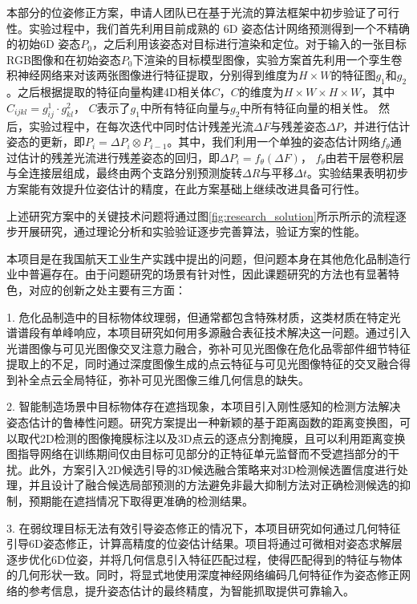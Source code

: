 \documentclass[12pt]{article}
\begin{document}
本部分的位姿修正方案，申请人团队已在基于光流的算法框架中初步验证了可行性。实验过程中，我们首先利用目前成熟的 6D 姿态估计网络预测得到一个不精确的初始6D 姿态$P_0$，之后利用该姿态对目标进行渲染和定位。对于输入的一张目标RGB图像和在初始姿态$P_0$下渲染的目标模型图像，实验方案首先利用一个孪生卷积神经网络来对该两张图像进行特征提取，分别得到维度为$H\times W$的特征图$g_1$和$g_2$。之后根据提取的特征向量构建4D相关体$C$，$C$的维度为$H\times W \times H \times W$，其中    $C_{ijkl} = g^1_{ij} \cdot g^2_{kl}$，
$C$表示了$g_1$中所有特征向量与$g_2$中所有特征向量的相关性。
然后，实验过程中，在每次迭代中同时估计残差光流$\Delta F$与残差姿态$\Delta P$，并进行估计姿态的更新，即$P_i = \Delta P_i \otimes P_{i-1}$。其中，我们利用一个单独的姿态估计网络$f_{\theta}$通过估计的残差光流进行残差姿态的回归，即$\Delta P_i = f_{\theta}(\Delta F)$，
$f_\theta$由若干层卷积层与全连接层组成，最终由两个支路分别预测旋转$\Delta R$与平移$\Delta t$。实验结果表明初步方案能有效提升位姿估计的精度，在此方案基础上继续改进具备可行性。

上述研究方案中的关键技术问题将通过图\ref{fig:research_solution}所示所示的流程逐步开展研究，通过理论分析和实验验证逐步完善算法，验证方案的性能。



本项目是在我国航天工业生产实践中提出的问题，但问题本身在其他危化品制造行业中普遍存在。由于问题研究的场景有针对性，因此课题研究的方法也有显著特色，对应的创新之处主要有三方面：

1. 危化品制造中的目标物体纹理弱，但通常都包含特殊材质，这类材质在特定光谱谱段有单峰响应，本项目研究如何用多源融合表征技术解决这一问题。通过引入光谱图像与可见光图像交叉注意力融合，弥补可见光图像在危化品零部件细节特征提取上的不足，同时通过深度图像生成的点云特征与可见光图像特征的交叉融合得到补全点云全局特征，弥补可见光图像三维几何信息的缺失。

2. 智能制造场景中目标物体存在遮挡现象，本项目引入刚性感知的检测方法解决姿态估计的鲁棒性问题。研究方案提出一种新颖的基于距离函数的距离变换图，可以取代2D检测的图像掩膜标注以及3D点云的逐点分割掩膜，且可以利用距离变换图指导网络在训练期间仅由目标可见部分的正特征单元监督而不受遮挡部分的干扰。此外，方案引入2D候选引导的3D候选融合策略来对3D检测候选置信度进行处理，并且设计了融合候选局部预测的方法避免非最大抑制方法对正确检测候选的抑制，预期能在遮挡情况下取得更准确的检测结果。

3. 在弱纹理目标无法有效引导姿态修正的情况下，本项目研究如何通过几何特征引导6D姿态修正，计算高精度的位姿估计结果。项目将通过可微相对姿态求解层逐步优化6D位姿，并将几何信息引入特征匹配过程，使得匹配得到的特征与物体的几何形状一致。同时，将显式地使用深度神经网络编码几何特征作为姿态修正网络的参考信息，提升姿态估计的最终精度，为智能抓取提供可靠输入。
\end{document}
